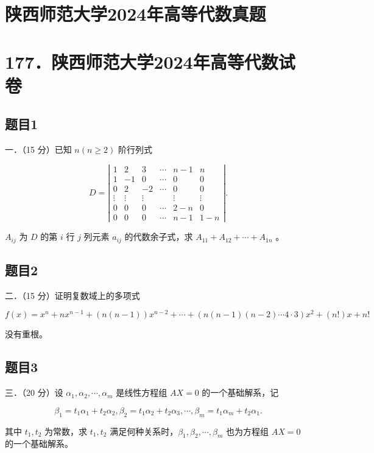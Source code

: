 \documentclass{article}
\begin{document}
\section*{陕西师范大学2024年高等代数真题}
\section*{177．陕西师范大学2024年高等代数试卷}

\subsection{题目1}
一．（15 分）已知 \(n(n \geq 2)\) 阶行列式

\[
D=\left|\begin{array}{cccccc}
1 & 2 & 3 & \cdots & n-1 & n \\
1 & -1 & 0 & \cdots & 0 & 0 \\
0 & 2 & -2 & \cdots & 0 & 0 \\
\vdots & \vdots & \vdots & & \vdots & \vdots \\
0 & 0 & 0 & \cdots & 2-n & 0 \\
0 & 0 & 0 & \cdots & n-1 & 1-n
\end{array}\right| .
\]

\(A_{i j}\) 为 \(D\) 的第 \(i\) 行 \(j\) 列元素 \(a_{i j}\) 的代数余子式，求 \(A_{11}+A_{12}+\cdots+A_{1 n}\) 。

\subsection{题目2}
二．（15 分）证明复数域上的多项式

\[
f(x)=x^{n}+n x^{n-1}+(n(n-1)) x^{n-2}+\cdots+(n(n-1)(n-2) \cdots 4 \cdot 3) x^{2}+(n!) x+n!
\]

没有重根。

\subsection{题目3}
三．（20 分）设 \(\alpha_{1}, \alpha_{2}, \cdots, \alpha_{m}\) 是线性方程组 \(A X=0\) 的一个基础解系，记

\[
\beta_{1}=t_{1} \alpha_{1}+t_{2} \alpha_{2}, \beta_{2}=t_{1} \alpha_{2}+t_{2} \alpha_{3}, \cdots, \beta_{m}=t_{1} \alpha_{m}+t_{2} \alpha_{1} .
\]

其中 \(t_{1}, t_{2}\) 为常数，求 \(t_{1}, t_{2}\) 满足何种关系时，\(\beta_{1}, \beta_{2}, \cdots, \beta_{m}\) 也为方程组 \(A X=0\) 的一个基础解系。
\end{document}
